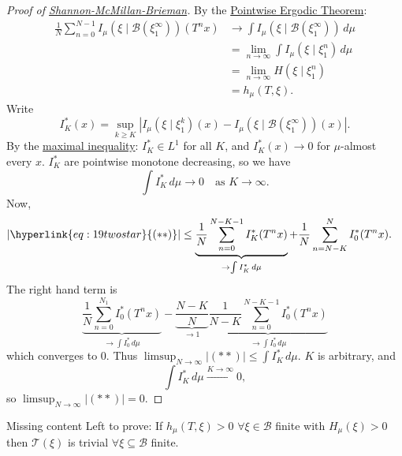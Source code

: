 \documentclass{article}
\begin{document}
\begin{proof}[Proof of \hyperlink{def:smb}{Shannon-McMillan-Brieman}]
  By the \hyperlink{thm:pet}{Pointwise Ergodic Theorem}:
  \begin{align*}
    \frac{1}{N} \sum_{n=0}^{N-1} I_\mu(\xi \mid \mathcal{B}(\xi_1^\infty))(T^n x) &\to \int I_\mu(\xi \mid \mathcal{B}(\xi_1^\infty)) \, d\mu \\
                                                                                  &=\lim_{n\to\infty} \int I_\mu(\xi \mid \xi_1^n) \, d\mu \\
                                                                                  &=\lim_{n\to\infty} H(\xi \mid \xi_1^n) \\
                                                                                  &= h_\mu(T, \xi).
  \end{align*}
  Write
  \begin{equation*}
    I_K^*(x) = \sup_{k \geq K} \left\lvert I_\mu\left(\xi \mid \xi_1^k\right)(x) - I_\mu\left(\xi \mid \mathcal{B}(\xi_1^\infty)\right)(x)\right\rvert.
  \end{equation*}
  By the \hyperlink{thm:maxineq}{maximal inequality}: $I_K^* \in L^1$ for all $K$, and $I_K^*(x) \to 0$ for $\mu$-almost every $x$.
  $I_K^*$ are pointwise monotone decreasing, so we have
  \begin{equation*}
    \int I_K^* \, d\mu \to 0 \quad \text{as } K \to \infty.
  \end{equation*}
  Now,
  \begin{align*}
    |\hyperlink{eq:19twostar}{(**)}| &\leq \underbrace{\frac{1}{N} \sum_{n=0}^{N-K-1} I_K^*(T^n x)}_{\to \int I_K^* \, d\mu} + \frac{1}{N} \sum_{n=N-K}^{N} I_0^*(T^n x).
  \end{align*}
  The right hand term is
  \begin{equation*}
    \underbrace{\frac{1}{N} \sum_{n=0}^{N_1} I_0^* (T^n x)}_{\to \int\!I_0^* \, d\mu} - \underbrace{\frac{N-K}{N}}_{\to 1} \underbrace{\frac{1}{N-K} \sum_{n=0}^{N-K-1} I_0^*(T^n x)}_{\to \int\!I_0^*\,d\mu}
  \end{equation*}
  which converges to 0.
  Thus $\limsup_{N \to \infty} |(**)| \leq \int I_K^*\,d\mu$.
  $K$ is arbitrary, and
  \begin{equation*}\int I_K^* \, d\mu \xrightarrow{K \to\infty}0,\end{equation*}
  so $\limsup_{N \to \infty} |(**)| = 0$.
\end{proof}
Missing content
Left to prove: If $h_\mu(T,\xi) > 0$ $\forall \xi \in \mathcal{B}$ finite with $H_\mu(\xi) > 0$ then $\mathcal{T}(\xi)$ is trivial $\forall \xi \subseteq \mathcal{B}$ finite.
\end{document}
